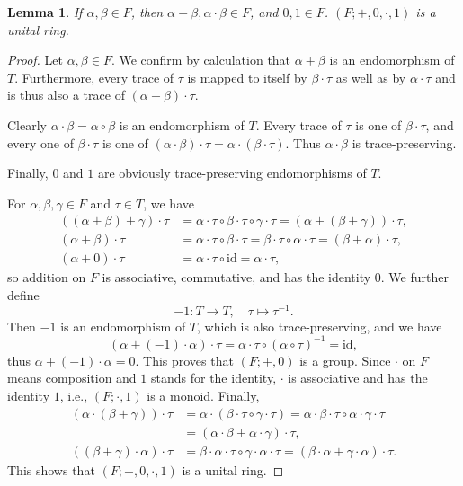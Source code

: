 \documentclass[11pt,a4paper]{article}
\newtheorem{lemma}[theorem]{Lemma}
\begin{document}
\begin{lemma} \label{lem:endomorphism_ring}
If $\alpha, \beta \in F$, then $\alpha + \beta, \alpha \cdot \beta \in F$, and $0, 1 \in F$. $(F; +, 0, \cdot, 1)$ is a unital ring.
\end{lemma}

\begin{proof}
Let $\alpha, \beta \in F$. We confirm by calculation that $\alpha + \beta$ is an endomorphism of $T$. Furthermore, every trace of $\tau$ is mapped to itself by $\beta \cdot \tau$ as well as by $\alpha \cdot \tau$ and is thus also a trace of $(\alpha + \beta) \cdot \tau$.

Clearly $\alpha \cdot \beta = \alpha \circ \beta$ is an endomorphism of $T$. Every trace of $\tau$ is one of $\beta \cdot \tau$, and every one of $\beta \cdot \tau$ is one of $(\alpha \cdot \beta) \cdot \tau = \alpha \cdot (\beta \cdot \tau)$. Thus $\alpha \cdot \beta$ is trace-preserving.

Finally, $0$ and $1$ are obviously trace-preserving endomorphisms of $T$.

For $\alpha, \beta, \gamma \in F$ and $\tau \in T$, we have
\begin{align*}
    ((\alpha + \beta) + \gamma) \cdot \tau &= \alpha \cdot \tau \circ \beta \cdot \tau \circ \gamma \cdot \tau = (\alpha + (\beta + \gamma)) \cdot \tau, \\
    (\alpha + \beta) \cdot \tau &= \alpha \cdot \tau \circ \beta \cdot \tau = \beta \cdot \tau \circ \alpha \cdot \tau = (\beta + \alpha) \cdot \tau, \\
    (\alpha + 0) \cdot \tau &= \alpha \cdot \tau \circ \text{id} = \alpha \cdot \tau,
\end{align*}
so addition on $F$ is associative, commutative, and has the identity $0$. We further define
\[ -1: T \to T, \quad \tau \mapsto \tau^{-1}. \]
Then $-1$ is an endomorphism of $T$, which is also trace-preserving, and we have
\[ (\alpha + (-1) \cdot \alpha) \cdot \tau = \alpha \cdot \tau \circ (\alpha \circ \tau)^{-1} = \text{id}, \]
thus $\alpha + (-1) \cdot \alpha = 0$. This proves that $(F; +, 0)$ is a group. Since $\cdot$ on $F$ means composition and $1$ stands for the identity, $\cdot$ is associative and has the identity $1$, i.e., $(F; \cdot, 1)$ is a monoid. Finally,
\begin{align*}
    (\alpha \cdot (\beta + \gamma)) \cdot \tau &= \alpha \cdot (\beta \cdot \tau \circ \gamma \cdot \tau) = \alpha \cdot \beta \cdot \tau \circ \alpha \cdot \gamma \cdot \tau \\
    &= (\alpha \cdot \beta + \alpha \cdot \gamma) \cdot \tau, \\
    ((\beta + \gamma) \cdot \alpha) \cdot \tau &= \beta \cdot \alpha \cdot \tau \circ \gamma \cdot \alpha \cdot \tau = (\beta \cdot \alpha + \gamma \cdot \alpha) \cdot \tau.
\end{align*}
This shows that $(F; +, 0, \cdot, 1)$ is a unital ring.
\end{proof}
\end{document}
